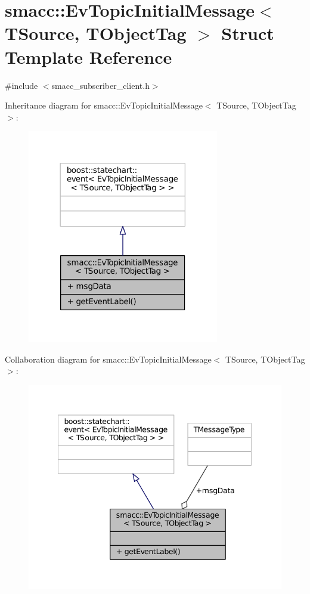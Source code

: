 \hypertarget{structsmacc_1_1EvTopicInitialMessage}{}\section{smacc\+:\+:Ev\+Topic\+Initial\+Message$<$ T\+Source, T\+Object\+Tag $>$ Struct Template Reference}
\label{structsmacc_1_1EvTopicInitialMessage}


{\ttfamily \#include $<$smacc\+\_\+subscriber\+\_\+client.\+h$>$}



Inheritance diagram for smacc\+:\+:Ev\+Topic\+Initial\+Message$<$ T\+Source, T\+Object\+Tag $>$\+:
\nopagebreak
\begin{figure}[H]
\begin{center}
\leavevmode
\includegraphics[width=237pt]{structsmacc_1_1EvTopicInitialMessage__inherit__graph}
\end{center}
\end{figure}


Collaboration diagram for smacc\+:\+:Ev\+Topic\+Initial\+Message$<$ T\+Source, T\+Object\+Tag $>$\+:
\nopagebreak
\begin{figure}[H]
\begin{center}
\leavevmode
\includegraphics[width=342pt]{structsmacc_1_1EvTopicInitialMessage__coll__graph}
\end{center}
\end{figure}
